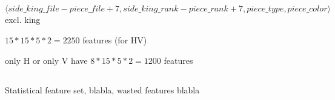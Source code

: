 \subsection{\mdseries{}}


$\langle side\_king\_file - piece\_file + 7, side\_king\_rank - piece\_rank + 7, piece\_type, piece\_color \rangle$ excl. king

$15*15*5*2=2250$ features (for HV)

only H or only V have $8*15*5*2=1200$ features


\subsection{\mdseries{}}

Statistical feature set, blabla, wasted features blabla

